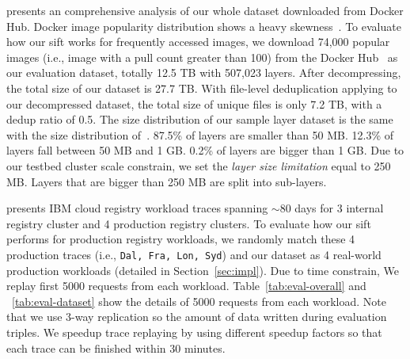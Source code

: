 \cite{xxx} presents an comprehensive analysis of our whole dataset downloaded from Docker Hub. 
Docker image popularity distribution shows a heavy skewness~\cite{analysisdockergithub}.
To evaluate how our sift works for frequently accessed images,
we download 74,000 popular images (i.e., image with a pull count greater than 100) from the Docker Hub~\cite{docker-hub} 
as our evaluation dataset, 
totally 12.5 TB with 507,023 layers.
After decompressing,  the total size of our dataset is 27.7 TB.
With file-level deduplication applying to our decompressed dataset, 
the total size of unique files is only 7.2 TB, with a dedup ratio of 0.5.
The size distribution of our sample layer dataset is the same with the size distribution of~\cite{analysisdockergithub}.
87.5\% of layers are smaller than 50 MB.
12.3\% of layers fall between 50 MB and 1 GB.
0.2\% of layers are bigger than 1 GB.
Due to our testbed cluster scale constrain, we set the \emph{layer size limitation} equal to 250 MB. 
Layers that are bigger than 250 MB are split into sub-layers.

\cite{dockerworkload} presents IBM cloud registry workload traces 
spanning $\sim$80 days for 3 internal registry cluster and 4 production registry clusters. 
To evaluate how our sift performs for production registry workloads,
we randomly match these 4 production traces (i.e., \texttt{Dal, Fra, Lon, Syd}) and our dataset as 4 real-world production workloads
(detailed in Section~\ref{sec:impl}). 
Due to time constrain,
We replay first 5000 requests from each workload.
Table~\ref{tab:eval-overall} and ~\ref{tab:eval-dataset} show the details of 5000 requests from each workload.
Note that we use 3-way replication
so the amount of data written during evaluation triples.
We speedup trace replaying by using different speedup factors
so that each trace can be finished within 30 minutes.





